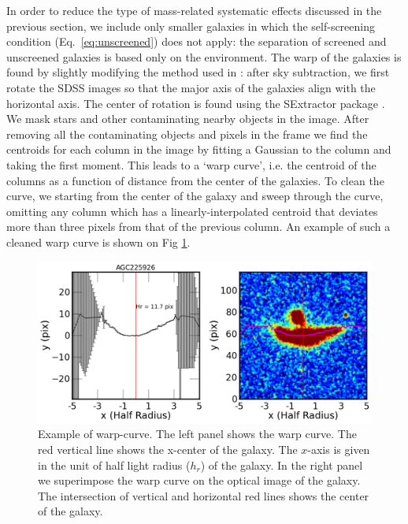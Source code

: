 \documentclass[useAMS,usenatbib,twocolumn]{mn2e}
\begin{document}
In order to reduce the type of mass-related systematic effects discussed in
the previous  section, we include only smaller galaxies in which the
self-screening condition (Eq.\ \ref{eq:unscreened}) does not apply: the
separation of screened and
unscreened galaxies is based only on the environment.
The warp of the galaxies is found by slightly modifying the method used
in \citet{jim97}: after sky subtraction, we first rotate the SDSS images
so that the major axis of the galaxies align with the horizontal axis.
The center of rotation is found using the SExtractor package \citep{bertin96}.
We mask stars and other contaminating
nearby objects in the image. After removing all the contaminating objects and
pixels in the frame we find the centroids
for each column in the image by fitting a Gaussian to the column and taking the
first moment. This leads to a `warp curve', i.e. the centroid of the
columns as a function of distance from the center of the galaxies.
To clean the curve, we starting from the center of the galaxy and
sweep through the curve, omitting any column which has a linearly-interpolated
centroid that deviates more than three pixels from that of the previous column.
An example of such a cleaned warp curve is shown on Fig \ref{warp-eg}.

\begin{figure}
\begin{center}
  \includegraphics[scale=0.5]{figures/AGC225926-warp-curve.png}
\caption{Example of warp-curve. The left panel shows the warp curve. The red
vertical line shows the x-center of the galaxy. The $x$-axis is given in the unit
of half light radius ($h_r$) of the galaxy. In the right panel we superimpose
the warp curve on the optical image of the galaxy. The intersection of vertical
and horizontal red lines shows the center of the galaxy.}
\label{warp-eg}
\end{center}
\end{figure}
\end{document}
